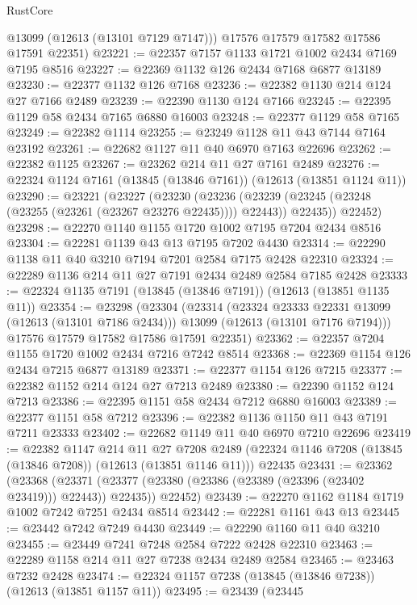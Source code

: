 \begin{lexlean}{RustCore}
\begin{coremodule}
        @13099
        (@12613 (@13101 @7129 @7147)))
      @17576
      @17579
      @17582
      @17586
      @17591
      @22351)
@23221 := @22357 @7157 @1133 @1721 @1002 @2434 @7169 @7195 @8516
@23227 := @22369 @1132 @126 @2434 @7168 @6877 @13189
@23230 := @22377 @1132 @126 @7168
@23236 := @22382 @1130 @214 @124 @27 @7166 @2489
@23239 := @22390 @1130 @124 @7166
@23245 := @22395 @1129 @58 @2434 @7165 @6880 @16003
@23248 := @22377 @1129 @58 @7165
@23249 := @22382 @1114
@23255 := @23249 @1128 @11 @43 @7144 @7164 @23192
@23261 := @22682 @1127 @11 @40 @6970 @7163 @22696
@23262 := @22382 @1125
@23267 := @23262 @214 @11 @27 @7161 @2489
@23276 := @22324 @1124 @7161 (@13845 (@13846 @7161)) (@12613 (@13851 @1124 @11))
@23290 := @23221
    (@23227
      (@23230
        (@23236 (@23239 (@23245 (@23248 (@23255 (@23261 (@23267 @23276 @22435)))) @22443)) @22435))
      @22452)
@23298 := @22270 @1140 @1155 @1720 @1002 @7195 @7204 @2434 @8516
@23304 := @22281 @1139 @43 @13 @7195 @7202 @4430
@23314 := @22290 @1138 @11 @40 @3210 @7194 @7201 @2584 @7175 @2428 @22310
@23324 := @22289 @1136 @214 @11 @27 @7191 @2434 @2489 @2584 @7185 @2428
@23333 := @22324 @1135 @7191 (@13845 (@13846 @7191)) (@12613 (@13851 @1135 @11))
@23354 := @23298
    (@23304
      (@23314
        (@23324 @23333 @22331 @13099 (@12613 (@13101 @7186 @2434)))
        @13099
        (@12613 (@13101 @7176 @7194)))
      @17576
      @17579
      @17582
      @17586
      @17591
      @22351)
@23362 := @22357 @7204 @1155 @1720 @1002 @2434 @7216 @7242 @8514
@23368 := @22369 @1154 @126 @2434 @7215 @6877 @13189
@23371 := @22377 @1154 @126 @7215
@23377 := @22382 @1152 @214 @124 @27 @7213 @2489
@23380 := @22390 @1152 @124 @7213
@23386 := @22395 @1151 @58 @2434 @7212 @6880 @16003
@23389 := @22377 @1151 @58 @7212
@23396 := @22382 @1136 @1150 @11 @43 @7191 @7211 @23333
@23402 := @22682 @1149 @11 @40 @6970 @7210 @22696
@23419 := @22382
    @1147
    @214
    @11
    @27
    @7208
    @2489
    (@22324 @1146 @7208 (@13845 (@13846 @7208)) (@12613 (@13851 @1146 @11)))
    @22435
@23431 := @23362
    (@23368
      (@23371 (@23377 (@23380 (@23386 (@23389 (@23396 (@23402 @23419))) @22443)) @22435))
      @22452)
@23439 := @22270 @1162 @1184 @1719 @1002 @7242 @7251 @2434 @8514
@23442 := @22281 @1161 @43 @13
@23445 := @23442 @7242 @7249 @4430
@23449 := @22290 @1160 @11 @40 @3210
@23455 := @23449 @7241 @7248 @2584 @7222 @2428 @22310
@23463 := @22289 @1158 @214 @11 @27 @7238 @2434 @2489 @2584
@23465 := @23463 @7232 @2428
@23474 := @22324 @1157 @7238 (@13845 (@13846 @7238)) (@12613 (@13851 @1157 @11))
@23495 := @23439
    (@23445

\end{coremodule}
\end{lexlean}
